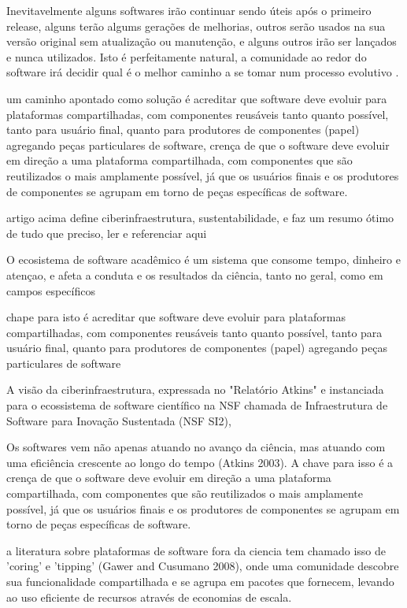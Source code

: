 Inevitavelmente alguns softwares irão continuar sendo úteis após o primeiro
release, alguns terão algums gerações de melhorias, outros serão usados na sua
versão original sem atualização ou manutenção, e alguns outros irão ser
lançados e nunca utilizados. Isto é perfeitamente natural, a comunidade ao
redor do software irá decidir qual é o melhor caminho a se tomar num processo
evolutivo \cite{weiner2009astronomical}.

um caminho apontado como solução é acreditar que software deve evoluir para plataformas compartilhadas,
com componentes reusáveis tanto quanto possível, tanto para usuário final, quanto
para produtores de componentes (papel) agregando peças particulares de software,
crença de que o software deve evoluir em direção a uma plataforma
compartilhada, com componentes que são reutilizados o mais amplamente possível,
já que os usuários finais e os produtores de componentes se agrupam em torno de
peças específicas de software.

 artigo acima define ciberinfraestrutura, sustentabilidade, e faz um resumo
 ótimo de tudo que preciso, ler e referenciar aqui

O ecosistema de software acadêmico é um sistema que consome tempo, dinheiro e
atençao, e afeta a conduta e os resultados da ciência, tanto no geral, como em
campos específicos

chape para isto é acreditar que software deve evoluir para plataformas compartilhadas,
com componentes reusáveis tanto quanto possível, tanto para usuário final, quanto
para produtores de componentes (papel) agregando peças particulares de software

A visão da ciberinfraestrutura, expressada no "Relatório Atkins" e instanciada
para o ecossistema de software científico na NSF chamada de Infraestrutura de
Software para Inovação Sustentada (NSF SI2),

Os softwares vem não apenas atuando no avanço da ciência, mas atuando com uma
eficiência crescente ao longo do tempo (Atkins 2003). A chave para isso é a
crença de que o software deve evoluir em direção a uma plataforma
compartilhada, com componentes que são reutilizados o mais amplamente possível,
já que os usuários finais e os produtores de componentes se agrupam em torno de
peças específicas de software.

a literatura sobre plataformas de software fora da ciencia tem chamado isso de
'coring' e 'tipping' (Gawer and Cusumano 2008),
onde uma comunidade descobre sua funcionalidade compartilhada e se agrupa
em pacotes que fornecem, levando ao uso eficiente de recursos através de
economias de escala.


